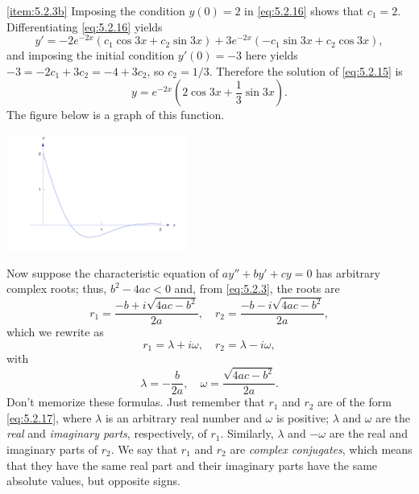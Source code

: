 \documentclass{ximera}
\begin{document}
\begin{example}
\begin{explanation}
\ref{item:5.2.3b}   Imposing the condition $y(0)=2$
in   \eqref{eq:5.2.16} shows that $c_1=2$.  Differentiating
\eqref{eq:5.2.16} yields
$$
y'=-2e^{-2x}(c_1\cos 3x+c_2\sin 3x) +3e^{-2x}(-c_1\sin 3x +c_2\cos 3x),
$$
and imposing the initial condition $y'(0)=-3$ here yields
$-3=-2c_1+3c_2=-4+3c_2$,
 so $c_2=1/3$. Therefore the solution of
\eqref{eq:5.2.15} is
$$
y=e^{-2x}(2\cos 3x+ \frac{1}{3}\sin 3x).
$$
The figure below is a graph of this function.
 
\begin{image}
 \includegraphics[height=1.5in]{fig050203.jpg}
 \end{image}
\end{explanation}
\end{example}
 
 
Now suppose   the characteristic equation of $ay''+by'+cy=0$ has
arbitrary complex roots;   thus, $b^2-4ac<0$ and, from \eqref{eq:5.2.3},
the
roots are
$$
r_1 = \frac{-b+i\sqrt{4ac-b^2}}{2a},\quad r_2 =
\frac{-b-i\sqrt{4ac-b^2}}{2a},
$$
which we rewrite as
\begin{equation} \label{eq:5.2.17}
r_1=\lambda+i \omega,\quad r_2 = \lambda - i \omega,
\end{equation}
 with
$$
\lambda = -\frac{b}{2a},\quad \omega = \frac{\sqrt{4ac-b^2}}{2a}.
$$
Don't memorize these formulas. Just remember that $r_1$
and $r_2$ are of the form \eqref{eq:5.2.17},
where  $\lambda$ is an arbitrary real number and $\omega$
is   positive;
 $\lambda$ and $\omega$ are  the \textit{real}
and \textit{imaginary parts}, respectively, of $r_1$.
Similarly, $\lambda$ and $-\omega$ are the real and imaginary parts of
$r_2$. We say that $r_1$ and $r_2$ are \textit{complex conjugates},
which means that they have the same real part and their imaginary
parts have the same absolute values, but opposite signs.
 
\end{document}
